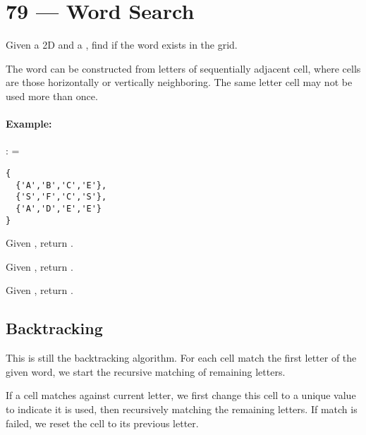 \section{79 --- Word Search}
Given a 2D  and a , find if the word exists in the grid.

The word can be constructed from letters of sequentially adjacent cell, where  cells are those horizontally or vertically neighboring. The same letter cell may not be used more than once.

\paragraph{Example:}
\begin{flushleft}


: =

\begin{lstlisting}[style=customc]
{
  {'A','B','C','E'},
  {'S','F','C','S'},
  {'A','D','E','E'}
}
\end{lstlisting}

Given , return .

Given , return .

Given , return .

\end{flushleft}

\subsection{Backtracking}
This is still the backtracking algorithm. For each cell match the first letter of the given word, we start the recursive matching of remaining letters.

If a cell matches against current letter, we first change this cell to a unique value to indicate it is used, then recursively matching the remaining letters. If match is failed, we reset the cell to its previous letter.

